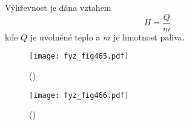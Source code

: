       Výhřevnost je dána vztahem
      \begin{equation*}
        H=\dfrac{Q}{m}
      \end{equation*}
      kde \(Q\) je uvolněné teplo a \(m\) je hmotnost paliva. 

      
      
      
      
    \begin{figure}[ht!] %
      \centering
      \texttt{[image: fyz\_fig465.pdf]}
      \caption{ 
               (\cite[s.~707]{Feynman01})}
      \label{fyz:fig465}
    \end{figure}

    \begin{figure}[ht!] %
      \centering
      \texttt{[image: fyz\_fig466.pdf]}
      \caption{ 
               (\cite[s.~707]{Feynman01})}
      \label{fyz:fig466}
    \end{figure}
    
